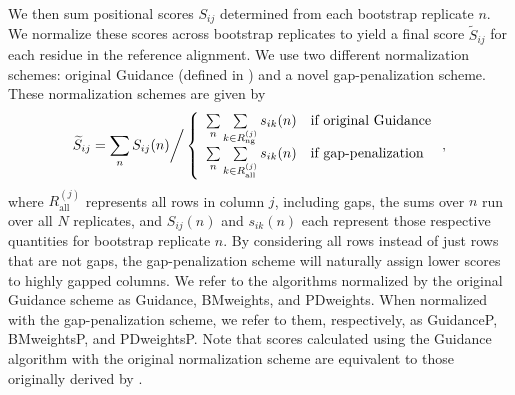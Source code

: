 \documentclass[11pt]{article}
\begin{document}
We then sum positional scores $S_{ij}$ determined from each bootstrap replicate $n$. We normalize these scores across bootstrap replicates to yield a final score $\widetilde{S}_{ij}$ for each residue in the reference alignment. We use two different normalization schemes: original Guidance (defined in \citet{Penn2010}) and a novel gap-penalization scheme. These normalization schemes are given by \begin{equation}
\widetilde{S}_{ij}  = \sum_n S_{ij}(n) \bigg{/} \left\{ \begin{array}{rl}

              \sum\limits_n \sum\limits_{k \in R_\text{ng}^{(j)}} s_{ik}(n)     &\mbox{if original Guidance} \\
              \sum\limits_n \sum\limits_{k \in R_\text{all}^{(j)}} s_{ik}(n)     &\mbox{if gap-penalization} \\      
        \end{array} \right.,
\end{equation} 
where $R_\text{all}^{(j)}$ represents all rows in column $j$, including gaps, the sums over $n$ run over all $N$ replicates, and $S_{ij}(n)$ and $s_{ik}(n)$ each represent those respective quantities for bootstrap replicate $n$. By considering all rows instead of just rows that are not gaps, the gap-penalization scheme will naturally assign lower scores to highly gapped columns. We refer to the algorithms normalized by the original Guidance scheme as Guidance, BMweights, and PDweights. When normalized with the gap-penalization scheme, we refer to them, respectively, as GuidanceP, BMweightsP, and PDweightsP. Note that scores calculated using the Guidance algorithm with the original normalization scheme are equivalent to those originally derived by \citet{Penn2010}. 
\end{document}
